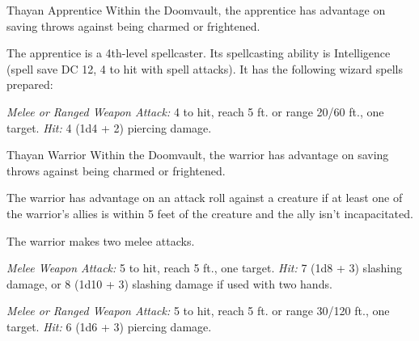 \documentclass[10pt,a4paper,twoside,bg=print,twocolumn,openany,nodeprecatedcode]{dndbook}
\begin{document}
\begin{DndMonster}[float=t]{Thayan Apprentice}
\DndMonsterBasics[
armor-class = {12 (15 with \textit{mage armor})},
hit-points = {\DndDice{5d8 + 5}},
speed = {30 ft.}
]
\DndMonsterAbilityScores[
 str = 10,
 dex = 14,
 con = 12,
 int = 15,
 wis = 13,
 cha = 11
]
\DndMonsterDetails[
skills = {Arcana +4},
languages = {Common, Thayan},
challenge = 2,
]
Within the Doomvault, the apprentice has advantage on saving throws against being charmed or frightened.

The apprentice is a 4th-level spellcaster. Its spellcasting ability is Intelligence (spell save DC 12, 4 to hit with spell attacks). It has the following wizard spells prepared:
\begin{DndMonsterSpells}
\end{DndMonsterSpells}
\textsl{Melee or Ranged Weapon Attack:} 4 to hit, reach 5 ft. or range 20/60 ft., one target. \textsl{Hit:} 4 (1d4 + 2) piercing damage.

\end{DndMonster}



\begin{DndMonster}[float=t]{Thayan Warrior}
\DndMonsterBasics[
armor-class = {16 (\textit{chain shirt})},
hit-points = {\DndDice{8d8 + 16}},
speed = {30 ft.}
]
\DndMonsterAbilityScores[
 str = 16,
 dex = 13,
 con = 14,
 int = 10,
 wis = 11,
 cha = 11
]
\DndMonsterDetails[
skills = {Perception +2},
languages = {Common, Thayan},
challenge = 2,
]
Within the Doomvault, the warrior has advantage on saving throws against being charmed or frightened.

The warrior has advantage on an attack roll against a creature if at least one of the warrior's allies is within 5 feet of the creature and the ally isn't incapacitated.

The warrior makes two melee attacks.

\textsl{Melee Weapon Attack:} 5 to hit, reach 5 ft., one target. \textsl{Hit:} 7 (1d8 + 3) slashing damage, or 8 (1d10 + 3) slashing damage if used with two hands.

\textsl{Melee or Ranged Weapon Attack:} 5 to hit, reach 5 ft. or range 30/120 ft., one target. \textsl{Hit:} 6 (1d6 + 3) piercing damage.

\end{DndMonster}
\end{document}
